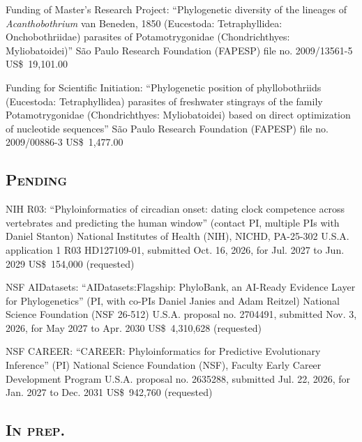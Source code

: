 \documentclass[11pt, letterpaper, sans]{moderncv}
\begin{document}
    {Funding of Master's Research Project: ``Phylogenetic diversity of the lineages of \textit{Acanthobothrium} van Beneden, 1850 (Eucestoda: Tetraphyllidea: Onchobothriidae) parasites of Potamotrygonidae (Chondrichthyes: Myliobatoidei)''}
    {São Paulo Research Foundation (FAPESP)}
    {file no. 2009/13561-5}
    {US\$~19,101.00}{}

    {Funding for Scientific Initiation: ``Phylogenetic position of phyllobothriids (Eucestoda: Tetraphyllidea) parasites of freshwater stingrays of the family Potamotrygonidae (Chondrichthyes: Myliobatoidei) based on direct optimization of nucleotide sequences''}
    {São Paulo Research Foundation (FAPESP)}
    {file no. 2009/00886-3}
    {US\$~1,477.00}{}

\vspace{.5em}
	\subsection{\textsc{Pending}}
\vspace{.5em}

    {NIH R03: ``Phyloinformatics of circadian onset: dating clock competence across vertebrates and predicting the human window'' (contact PI, multiple PIs with Daniel Stanton)}
    {National Institutes of Health (NIH), NICHD, PA-25-302}
    {U.S.A.}
    {application 1 R03 HD127109-01, submitted Oct. 16, 2026, for Jul. 2027 to Jun. 2029}
    {US\$~154,000 (requested)}{}

    {NSF AIDatasets: ``AIDatasets:Flagship: PhyloBank, an AI-Ready Evidence Layer for Phylogenetics'' (PI, with co-PIs Daniel Janies and Adam Reitzel)}
    {National Science Foundation (NSF 26-512)}
    {U.S.A.}
    {proposal no. 2704491, submitted Nov. 3, 2026, for May 2027 to Apr. 2030}
    {US\$~4,310,628 (requested)}{}

    {NSF CAREER: ``CAREER: Phyloinformatics for Predictive Evolutionary Inference'' (PI)}
    {National Science Foundation (NSF), Faculty Early Career Development Program}
    {U.S.A.}
    {proposal no. 2635288, submitted Jul. 22, 2026, for Jan. 2027 to Dec. 2031}
    {US\$~942,760 (requested)}{}

\vspace{.5em}
	\subsection{\textsc{In prep.}}
\vspace{.5em}
\end{document}
